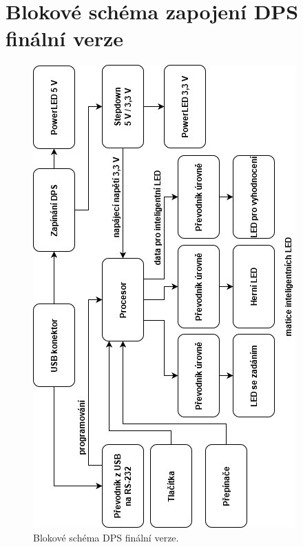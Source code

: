 \chapter{Blokové schéma zapojení DPS finální verze}

\begin{figure}[!h]
    \begin{center}
      \includegraphics[scale=1.1]{prilohy/v2_blokove_schema.jpg}
    \end{center}
    \caption[Blokové schéma DPS finální verze]{Blokové schéma DPS finální verze.}
  \end{figure}











